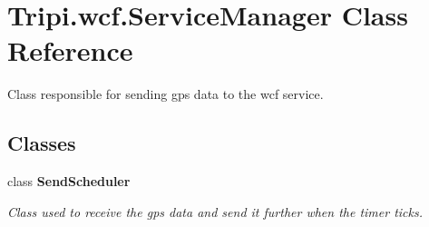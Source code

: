 \hypertarget{class_tripi_1_1wcf_1_1_service_manager}{
\section{Tripi.wcf.ServiceManager Class Reference}
\label{class_tripi_1_1wcf_1_1_service_manager}
}


Class responsible for sending gps data to the wcf service.  
\subsection*{Classes}
\begin{DoxyCompactItemize}
\item 
class {\bfseries SendScheduler}
\begin{DoxyCompactList}\small\item\em Class used to receive the gps data and send it further when the timer ticks. \item\end{DoxyCompactList}\end{DoxyCompactItemize}
